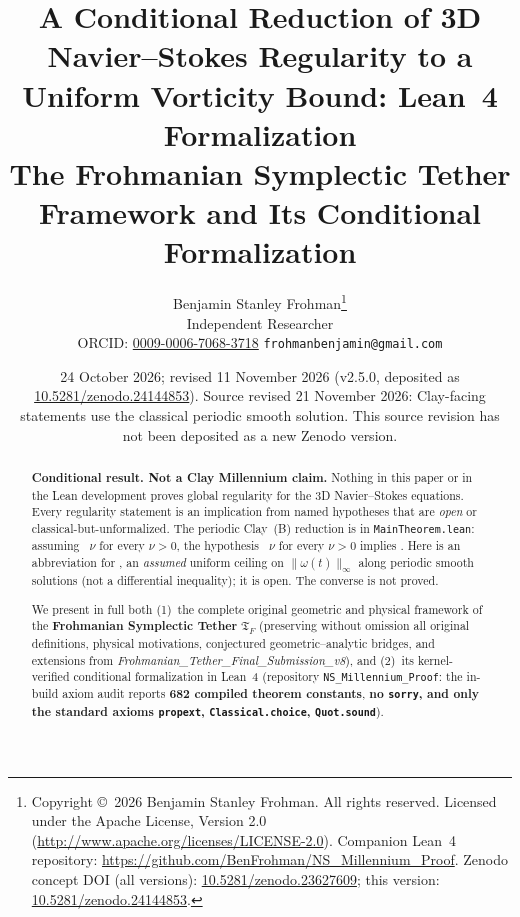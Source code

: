 \documentclass[11pt,a4paper]{article}
\title{A Conditional Reduction of 3D Navier--Stokes Regularity to a Uniform Vorticity Bound: Lean~4 Formalization\\[4pt]
\large The Frohmanian Symplectic Tether Framework and Its Conditional Formalization}
\author{Benjamin Stanley Frohman\thanks{Copyright \copyright\ 2026 Benjamin Stanley Frohman. All rights reserved. Licensed under the Apache License, Version 2.0 (\url{http://www.apache.org/licenses/LICENSE-2.0}). Companion Lean~4 repository: \url{https://github.com/BenFrohman/NS_Millennium_Proof}. Zenodo concept DOI (all versions): \href{https://doi.org/10.5281/zenodo.23627609}{10.5281/zenodo.23627609}; this version: \href{https://doi.org/10.5281/zenodo.24144853}{10.5281/zenodo.24144853}.}\\Independent Researcher\\\small ORCID: \href{https://orcid.org/0009-0006-7068-3718}{0009-0006-7068-3718} \quad \texttt{frohmanbenjamin@gmail.com}}
\date{24 October 2026; revised 11 November 2026 (v2.5.0, deposited as \href{https://doi.org/10.5281/zenodo.24144853}{10.5281/zenodo.24144853}). Source revised 21 November 2026: Clay-facing statements use the classical periodic smooth solution. This source revision has not been deposited as a new Zenodo version.}
\theoremstyle{plain}
\theoremstyle{definition}
\theoremstyle{remark}
\newcommand{\Tf}{\mathfrak{T}_F}
\begin{document}
\maketitle

\begin{abstract}
\textbf{Conditional result. Not a Clay Millennium claim.} Nothing in this paper or in the Lean development proves global regularity for the 3D Navier--Stokes equations. Every regularity statement is an implication from named hypotheses that are \emph{open} or classical-but-unformalized. The periodic Clay~(B) reduction is  in \texttt{MainTheorem.lean}: assuming ~$\nu$ for every $\nu>0$, the hypothesis ~$\nu$ for every $\nu>0$ implies . Here  is an abbreviation for , an \emph{assumed} uniform ceiling on $\|\omega(t)\|_\infty$ along periodic smooth solutions (not a differential inequality); it is open. The converse is not proved.

We present in full both (1)~the complete original geometric and physical framework of the \textbf{Frohmanian Symplectic Tether} $\Tf$ (preserving without omission all original definitions, physical motivations, conjectured geometric--analytic bridges, and extensions from \emph{Frohmanian\_Tether\_Final\_Submission\_v8}), and (2)~its kernel-verified conditional formalization in Lean~4 (repository \texttt{NS\_Millennium\_Proof}: the in-build axiom audit reports \textbf{682 compiled theorem constants}, \textbf{no \texttt{sorry}, and only the standard axioms \texttt{propext}, \texttt{Classical.choice}, \texttt{Quot.sound}}).


\end{abstract}
\end{document}
